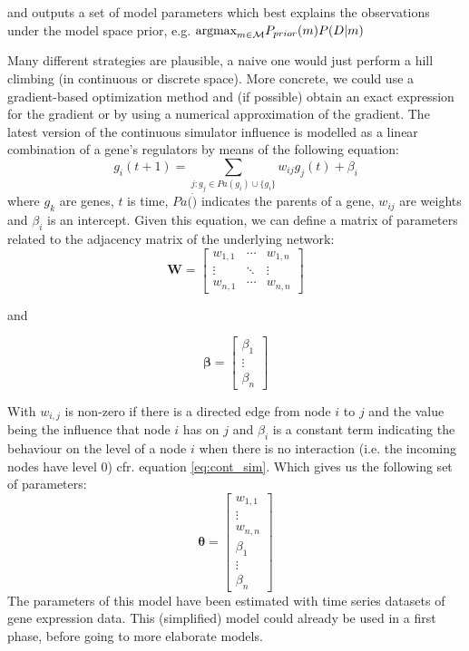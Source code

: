 \documentclass{article}
\begin{document}
and outputs a set of model parameters which best explains the observations under the model space prior, e.g.
$\hbox{argmax}_{m\in\mathcal{M}} P_{prior}(m)P(D|m)$

Many different strategies are plausible, a naive one would just perform a hill climbing (in continuous or discrete space). More concrete, we could use a gradient-based optimization method and (if possible)
obtain an exact expression for the gradient or by using a numerical approximation of the gradient.
The latest version of the continuous simulator influence is modelled as a linear combination of a gene's regulators by means of the following equation:
\begin{equation}
 g_i(t+1) = \sum_{j : g_j \in Pa(g_i) \cup \{g_i\} } w_{ij}g_j(t) + \beta_{i}
 \label{eq:cont_sim}
\end{equation}
where $g_k$ are genes, $t$ is time, $Pa(\dot)$ indicates the parents of a gene, $w_{ij}$ are weights and $\beta_i$ is an intercept. 
Given this equation, we can define a matrix of parameters related to the adjacency matrix of the underlying network:
\begin{equation}
\mathbf{W} = \begin{bmatrix} 
w_{1,1} &\cdots & w_{1,n}\\
\vdots & \ddots & \vdots \\
w_{n,1} & \cdots & w_{n,n} 
      \end{bmatrix}
\end{equation}


and

\begin{equation}
 \mathbf{\beta} = \begin{bmatrix}
      \beta_1 \\
      \vdots \\
      \beta_n 
     \end{bmatrix}
\end{equation}

With $w_{i,j}$ is non-zero if there is a directed edge from node $i$ to $j$ and the value being the influence that node $i$ has on $j$ and $\beta_i$ is a constant term indicating the behaviour on the level of a node $i$ 
when there is no interaction (i.e. the incoming nodes have level 0) cfr. equation \ref{eq:cont_sim}. Which gives us the following set of parameters:
\begin{equation}
 \mathbf{\theta} = \begin{bmatrix}
                     w_{1,1} \\
                     \vdots \\
                     w_{n,n} \\
                     \beta_1 \\
                     \vdots \\
                     \beta_n
                    \end{bmatrix}
% 
\end{equation}
The parameters of this model have been estimated with time series datasets of gene expression data. This (simplified) model could already be used in a first phase, before going to more elaborate models.
\end{document}
